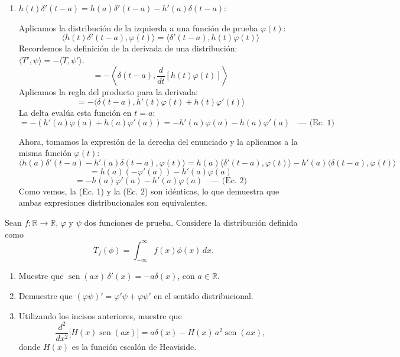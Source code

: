 \documentclass[11pt,spanish]{article}
\newcounter{problema}
\newcommand{\prob}{\stepcounter{problema} \vspace{.5cm} \noindent{\bf Problema \arabic{problema}: }}
\begin{document}
\begin{enumerate}
(Nota: Asumimos raíces simples, es decir, $h'(t_i) \neq 0$).
Esta propiedad es la generalización directa de lo que demostramos en el Problema 9.
Para evaluarla sobre una función de prueba, notamos que $\delta(h(t))$ solo es no nula cerca de los puntos $t_i$ donde $h(t_i) = 0$.
Podemos separar la integral en la suma de pequeñas integrales alrededor de cada raíz $t_i$:
$$\langle \delta(h(t)), \varphi(t) \rangle = \sum_i \int_{t_i-\epsilon}^{t_i+\epsilon} \delta(h(t))\varphi(t) dt$$
Para cada una de estas integrales locales, la función $h(t)$ cruza por cero una sola vez. Aplicando exactamente el resultado del Problema 9 a cada término de la sumatoria:
$$\int_{t_i-\epsilon}^{t_i+\epsilon} \delta(h(t))\varphi(t) dt = \frac{\varphi(t_i)}{|h'(t_i)|}$$
Por lo tanto:
$$\langle \delta(h(t)), \varphi(t) \rangle = \sum_i \frac{\varphi(t_i)}{|h'(t_i)|} = \sum_i \frac{1}{|h'(t_i)|} \langle \delta(t-t_i), \varphi(t) \rangle$$
$$\delta(h(t)) = \sum_i \frac{\delta(t-t_i)}{|h'(t_i)|}$$

\item $h(t)\delta'(t-a) = h(a)\delta'(t-a) - h'(a)\delta(t-a)$:

Aplicamos la distribución de la izquierda a una función de prueba $\varphi(t)$:
$$\langle h(t)\delta'(t-a), \varphi(t) \rangle = \langle \delta'(t-a), h(t)\varphi(t) \rangle$$
Recordemos la definición de la derivada de una distribución: $\langle T', \psi \rangle = -\langle T, \psi' \rangle$.
$$= - \left\langle \delta(t-a), \frac{d}{dt}[h(t)\varphi(t)] \right\rangle$$
Aplicamos la regla del producto para la derivada:
$$= - \langle \delta(t-a), h'(t)\varphi(t) + h(t)\varphi'(t) \rangle$$
La delta evalúa esta función en $t=a$:
$$= - \left( h'(a)\varphi(a) + h(a)\varphi'(a) \right) = - h'(a)\varphi(a) - h(a)\varphi'(a) \quad \text{--- (Ec. 1)}$$

Ahora, tomamos la expresión de la derecha del enunciado y la aplicamos a la misma función $\varphi(t)$:
$$\langle h(a)\delta'(t-a) - h'(a)\delta(t-a), \varphi(t) \rangle = h(a)\langle \delta'(t-a), \varphi(t) \rangle - h'(a)\langle \delta(t-a), \varphi(t) \rangle$$
$$= h(a) (-\varphi'(a)) - h'(a) \varphi(a)$$
$$= - h(a)\varphi'(a) - h'(a)\varphi(a) \quad \text{--- (Ec. 2)}$$
Como vemos, la (Ec. 1) y la (Ec. 2) son idénticas, lo que demuestra que ambas expresiones distribucionales son equivalentes.

\end{enumerate}


\prob Sean $f:\mathbb{R}\to\mathbb{R}$, $\varphi$ y $\psi$ dos funciones de prueba. Considere la distribución definida como
\[
T_f(\phi) = \int_{-\infty}^{\infty} f(x)\phi(x)\,dx.
\]
\begin{enumerate}
\item Muestre que $\operatorname{sen}(ax)\,\delta'(x) = -a\delta(x)$, con $a\in\mathbb{R}$.
\item Demuestre que $(\varphi\psi)' = \varphi'\psi + \varphi\psi'$ en el sentido distribucional.
\item Utilizando los incisos anteriores, muestre que
\[
\frac{d^2}{dx^2}\bigl[H(x)\operatorname{sen}(ax)\bigr] = a\delta(x) - H(x)\,a^2\operatorname{sen}(ax),
\]
donde $H(x)$ es la función escalón de Heaviside.
\end{enumerate}
\end{document}
